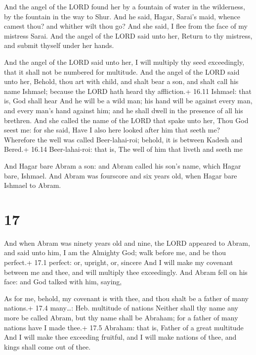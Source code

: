  And the angel of the LORD found her by a fountain of
water in the wilderness, by the fountain in the way to Shur.
 And he said, Hagar, Sarai's maid, whence camest thou? and
whither wilt thou go? And she said, I flee from the face of my mistress
Sarai.  And the angel of the LORD said unto her, Return to
thy mistress, and submit thyself under her hands.

 And the angel of the LORD said unto her, I will multiply
thy seed exceedingly, that it shall not be numbered for multitude.
 And the angel of the LORD said unto her, Behold, thou art
with child, and shalt bear a son, and shalt call his name Ishmael;
because the LORD hath heard thy affliction.+ 16.11 Ishmael: that is, God
shall hear  And he will be a wild man; his hand will be
against every man, and every man's hand against him; and he shall dwell
in the presence of all his brethren.  And she called the
name of the LORD that spake unto her, Thou God seest me: for she said,
Have I also here looked after him that seeth me?  Wherefore
the well was called Beer-lahai-roi; behold, it is between Kadesh and
Bered.+ 16.14 Beer-lahai-roi: that is, The well of him that liveth and
seeth me

 And Hagar bare Abram a son: and Abram called his son's
name, which Hagar bare, Ishmael.  And Abram was fourscore
and six years old, when Hagar bare Ishmael to Abram.

\hypertarget{section-16}{%
\section{17}\label{section-16}}

 And when Abram was ninety years old and nine, the LORD
appeared to Abram, and said unto him, I am the Almighty God; walk before
me, and be thou perfect.+ 17.1 perfect: or, upright, or, sincere
 And I will make my covenant between me and thee, and will
multiply thee exceedingly.  And Abram fell on his face: and
God talked with him, saying,

 As for me, behold, my covenant is with thee, and thou shalt
be a father of many nations.+ 17.4 many\ldots: Heb. multitude of nations
 Neither shall thy name any more be called Abram, but thy
name shall be Abraham; for a father of many nations have I made thee.+
17.5 Abraham: that is, Father of a great multitude  And I
will make thee exceeding fruitful, and I will make nations of thee, and
kings shall come out of thee.

